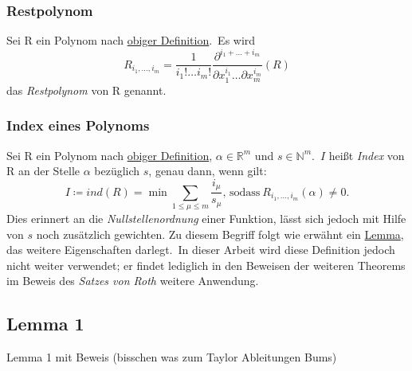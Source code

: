 \documentclass[11pt]{article}
\begin{document}
            \subsubsection{Restpolynom}
            \label{subsubsec:def-rempoly}
                Sei R ein Polynom nach \hyperref[subsubsec:def-poly]{obiger Definition}.\ Es wird
                \begin{equation}
                    R_{i_1, \dots, i_m} = \frac{1}{i_1! \dots i_m!} \frac{\partial^{i_1 + \dots + i_m}}{
                    \partial x_1^{i_1} \dots \partial x_m^{i_m}} (R) \label{eq:def-rempoly}
                \end{equation}
                das \emph{Restpolynom} von R genannt.
            
            \subsubsection{Index eines Polynoms}
            \label{subsubsec:def-index}
                \textrm{Sei R ein Polynom nach \hyperref[subsubsec:def-poly]{obiger Definition}, $\alpha \in \mathbb{R}^m$
                und $s \in \mathbb{N}^m$.\ $I$ heißt \emph{Index} von R an der Stelle $\alpha$ bezüglich $s$, genau dann,
                wenn gilt:}
                \begin{equation}
                    I \coloneq ind(R) = \min \sum_{1 \leq \mu \leq m} \frac{i_\mu}{s_\mu} \text{, sodass} \ R_{i_1, \dots, i_m}(\alpha)
                    \neq 0. \label{eq:def-index}
                \end{equation}
                \textrm{Dies erinnert an die \emph{Nullstellenordnung} einer Funktion, lässt sich jedoch mit Hilfe von $s$
                noch zusätzlich gewichten.}
                \newline
                \textrm{Zu diesem Begriff folgt wie erwähnt ein \hyperref[subsec:lemma2]{Lemma}, das weitere Eigenschaften darlegt.\ In
                dieser Arbeit wird diese Definition jedoch nicht weiter verwendet; er findet lediglich in den Beweisen
                der weiteren Theorems im Beweis des \emph{Satzes von Roth} weitere Anwendung.}
        
        \subsection{Lemma 1}
        \label{subsec:lemma1}
            Lemma 1 mit Beweis (bisschen was zum Taylor Ableitungen Bums)
        
\end{document}
